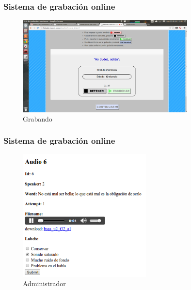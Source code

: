 \documentclass[mathserif]{beamer}%
\begin{document}
\begin{frame}
	\frametitle{Sistema de grabación online}
	
	\begin{figure}[h!]
		\centerline{\includegraphics[width=0.8\textwidth]{pag-grabar1} }
		\caption{Grabando}
		\label{figEncuesta}
	\end{figure}
\end{frame}

\begin{frame}
	\frametitle{Sistema de grabación online}
	
	\begin{figure}[h!]
		\centerline{\includegraphics[width=0.6\textwidth]{categorizando_audios} }
		\caption{Administrador}
		\label{figEncuesta}
	\end{figure}
\end{frame}
\end{document}
